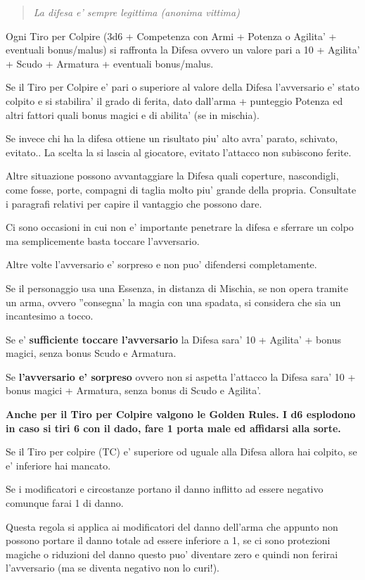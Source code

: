 \documentclass[a4paper,11pt,twoside,openany]{book}
\begin{document}
	\label{la-difesa}
	\begin{quote}\textit{
			La difesa e' sempre legittima (anonima vittima)
	}\end{quote}
	Ogni Tiro per Colpire (3d6 + Competenza con Armi + Potenza o Agilita' + eventuali bonus/malus) si raffronta la Difesa ovvero un valore pari a 10 + Agilita' + Scudo + Armatura + eventuali bonus/malus.
	
	Se il Tiro per Colpire e' pari o superiore al valore della Difesa l'avversario e' stato colpito e si stabilira' il grado di ferita, dato dall'arma + punteggio Potenza ed altri fattori quali bonus magici e di abilita' (se in mischia).
	
	Se invece chi ha la difesa ottiene un risultato piu' alto avra' parato, schivato, evitato.. La scelta la si lascia al giocatore, evitato l'attacco non subiscono ferite.
	
	Altre situazione possono avvantaggiare la Difesa quali coperture, nascondigli, come fosse, porte, compagni di taglia molto piu' grande della propria. Consultate i paragrafi relativi per capire il vantaggio che possono dare.
	
	Ci sono occasioni in cui non e' importante penetrare la difesa e sferrare un colpo ma semplicemente basta toccare l'avversario.
	
	Altre volte l'avversario e' sorpreso e non puo' difendersi completamente.
	
	Se il personaggio usa una Essenza, in distanza di Mischia, se non opera tramite un arma, ovvero ''consegna' la magia con una spadata, si considera che sia un incantesimo a tocco.
	
	Se e' \textbf{sufficiente toccare l'avversario} la Difesa sara' 10 + Agilita' + bonus magici, senza bonus Scudo e Armatura.
	
	Se \textbf{l'avversario e' sorpreso} ovvero non si aspetta l'attacco la Difesa sara' 10 + bonus magici + Armatura, senza bonus di Scudo e Agilita'.
	
	\textbf{Anche per il Tiro per Colpire valgono le Golden Rules. I d6 esplodono in caso si tiri 6 con il dado, fare 1 porta male ed affidarsi alla sorte.}
	
	Se il Tiro per colpire (TC) e' superiore od uguale alla Difesa allora hai colpito, se e' inferiore hai mancato.
	
	Se i modificatori e circostanze portano il danno inflitto ad essere negativo comunque farai 1 di danno.
	
	Questa regola si applica ai modificatori del danno dell'arma che appunto non possono portare il danno totale ad essere inferiore a 1, se ci sono protezioni magiche o riduzioni del danno questo puo' diventare zero e quindi non ferirai l'avversario (ma se diventa negativo non lo curi!).
	
\end{document}
